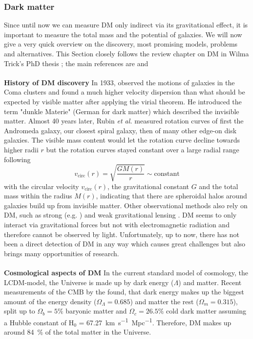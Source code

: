 \subsubsection{Dark matter}
Since until now we can measure \ac{DM} only indirect via its gravitational effect, it is important to measure the total mass and the potential of galaxies. We will now give a very quick overview on the discovery, most promising models, problems and alternatives. This Section closely follows the review chapter on \ac{DM} in Wilma Trick's PhD thesis \citep{Wilmathesis}; the main references are \citet{Ostriker...DM...2003, Maoz...astrophysics...2007} and \citet{Mo...galformev...2010} \\
\\\textbf{History of \ac{DM} discovery} In 1933, \citeauthor{Zwicky...DM...1933} observed the motions of galaxies in the Coma clusters and found a much higher velocity dispersion than what should be expected by visible matter after applying the virial theorem. He introduced the term "dunkle Materie" (German for dark matter) which described the invisible matter. Almost 40 years later, Rubin \textit{et al.} \citeyearpar{Rubin...DM...1970, Rubin...DM...1978, Rubin...DM...1980} measured rotation curves of first the Andromeda galaxy, our closest spiral galaxy, then of many other edge-on disk galaxies. The visible mass content would let the rotation curve decline towards higher radii $r$ but the rotation curves stayed constant over a large radial range following 
\begin{equation}\label{eq:circ_vel}
    v_{\mathrm{circ}}(r) = \sqrt{\frac{GM(r)}{r}} \sim \mathrm{constant}
\end{equation}
with the circular velocity $v_\mathrm{{circ}}(r)$, the gravitational constant $G$ and the total mass within the radius $M(r)$, indicating that there are spheroidal halos around galaxies build up from invisible matter. Other observational methods also rely on \ac{DM}, such as strong (e.g. \cite{Trick..stronglensing...2016}) and weak gravitational lensing \citep{Tyson...weaklensing...1990, Kaiser...weaklensing...1993}. \ac{DM} seems to only interact via gravitational forces but not with electromagnetic radiation and therefore cannot be observed by light. Unfortunately, up to now, there has not been a direct detection of \ac{DM} in any way which causes great challenges but also brings many opportunities of research.\\
\\\textbf{Cosmological aspects of \ac{DM}}
In the current standard model of cosmology, the \ac{LCDM}-model, the Universe is made up by dark energy ($\Lambda$) and matter. Recent measurements of the \ac{CMB} by the \citet{Planck...CMB...2018} found, that dark energy makes up the biggest amount of the energy density ($\Omega_\Lambda = 0.685$) and matter the rest ($\Omega_m = 0.315$), split up to $\Omega_b = 5\%$ baryonic matter and $\Omega_c = 26.5\%$ cold dark matter assuming a Hubble constant of H$_0$ =  \SI{67.27}{km.s^{-1}.Mpc^{-1}}. Therefore, \ac{DM} makes up around \SI{84}{\%} of the total matter in the Universe. \\
